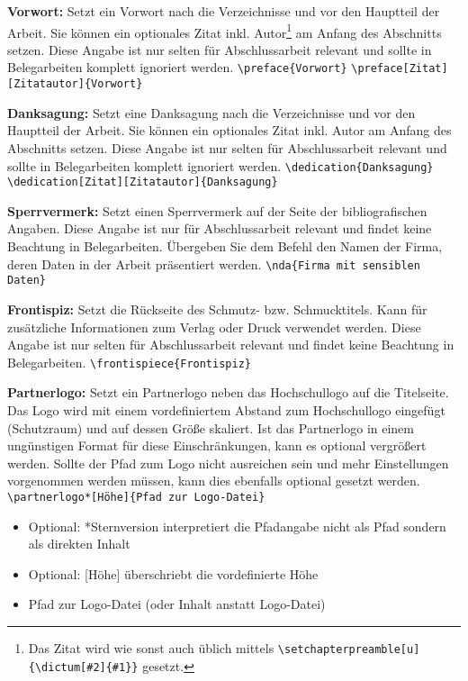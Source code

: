 \documentclass[
%
	thesis=paper,		%
	compactlistof,		%
	noauthorship,		%
%
	fancy,				%
%
%
]{hsmw-thesis}
\begin{document}
	\textbf{Vorwort:}\label{cmd:preface}
	Setzt ein Vorwort nach die Verzeichnisse und vor den Hauptteil der Arbeit.
	Sie können ein optionales Zitat inkl. Autor\footnote{\label{ftn:chapterquote}Das Zitat wird wie sonst auch üblich mittels \texttt{\textbackslash{}setchapterpreamble[u]\{\textbackslash{}dictum[\#2]\{\#1\}\}} gesetzt.} am Anfang des Abschnitts setzen.
	Diese Angabe ist nur selten für Abschlussarbeit relevant und sollte in Belegarbeiten komplett ignoriert werden.
	\newline
	\verb|\preface{Vorwort}|
	\newline
	\verb|\preface[Zitat][Zitatautor]{Vorwort}|
	
	\textbf{Danksagung:}\label{cmd:dedication}
	Setzt eine Danksagung nach die Verzeichnisse und vor den Hauptteil der Arbeit.
	Sie können ein optionales Zitat inkl. Autor am Anfang des Abschnitts setzen.
	Diese Angabe ist nur selten für Abschlussarbeit relevant und sollte in Belegarbeiten komplett ignoriert werden.
	\newline
	\verb|\dedication{Danksagung}|
	\newline
	\verb|\dedication[Zitat][Zitatautor]{Danksagung}|
	
	\textbf{Sperrvermerk:}\label{cmd:nda}
	Setzt einen Sperrvermerk auf der Seite der bibliografischen Angaben.
	Diese Angabe ist nur für Abschlussarbeit relevant und findet keine Beachtung in Belegarbeiten.
	Übergeben Sie dem Befehl den Namen der Firma, deren Daten in der Arbeit präsentiert werden.
	\newline
	\verb|\nda{Firma mit sensiblen Daten}|
	
	\textbf{Frontispiz:}\label{cmd:frontispiece}
	Setzt die Rückseite des Schmutz- bzw. Schmucktitels.
	Kann für zusätzliche Informationen zum Verlag oder Druck verwendet werden.
	Diese Angabe ist nur selten für Abschlussarbeit relevant und findet keine Beachtung in Belegarbeiten.
	\newline
	\verb|\frontispiece{Frontispiz}|
	
	\textbf{Partnerlogo:}\label{cmd:partnerlogo}
	Setzt ein Partnerlogo neben das Hochschullogo auf die Titelseite.
	Das Logo wird mit einem vordefiniertem Abstand zum Hochschullogo eingefügt (Schutzraum) und auf dessen Größe skaliert.
	Ist das Partnerlogo in einem ungünstigen Format für diese Einschränkungen, kann es optional vergrößert werden.
	Sollte der Pfad zum Logo nicht ausreichen sein und mehr Einstellungen vorgenommen werden müssen, kann dies ebenfalls optional gesetzt werden.
	\newline
	\verb|\partnerlogo*[Höhe]{Pfad zur Logo-Datei}|
	\begin{itemize}
		\item Optional: *Sternversion interpretiert die Pfadangabe nicht als Pfad sondern als direkten Inhalt
		\item Optional: [Höhe] überschriebt die vordefinierte Höhe
		\item Pfad zur Logo-Datei (oder Inhalt anstatt Logo-Datei)
	\end{itemize}
	
\end{document}
